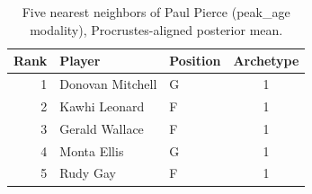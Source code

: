 \begin{table}[htbp]
  \centering\small
  \begin{tabular}{rllc}
    \toprule
    Rank & Player & Position & Archetype \\
    \midrule
    1 & Donovan Mitchell & G & 1 \\
    2 & Kawhi Leonard & F & 1 \\
    3 & Gerald Wallace & F & 1 \\
    4 & Monta Ellis & G & 1 \\
    5 & Rudy Gay & F & 1 \\
    \bottomrule
  \end{tabular}
  \caption{Five nearest neighbors of Paul Pierce (peak_age modality), Procrustes-aligned posterior mean.}
  \label{tab:Paul_Pierce_neighbors_peak_age}
\end{table}

